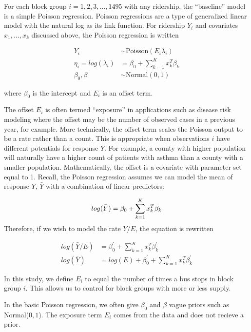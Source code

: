 \documentclass[
]{article}
\begin{document}
For each block group \(i = 1, 2, 3, ..., 1495\) with any ridership, the
``baseline'' model is a simple Poisson regression. Poisson regressions
are a type of generalized linear model with the natural log as its link
function. For ridership \(Y_i\) and covariates \(x_1, ..., x_k\)
discussed above, the Poisson regression is written

\[
\begin{aligned}
Y_i & \sim \text{Poisson}(E_i\lambda_i) \\
\eta_i  = log(\lambda_i) & = \beta_0 + \sum_{k=1}^{K}x_k^T\beta_k \\
\beta_0, \beta &\sim \text{Normal}(0, 1)
\end{aligned}
\]

where \(\beta_0\) is the intercept and \(E_i\) is an offset term.

The offset \(E_i\) is often termed ``exposure'' in applications such as
disease risk modeling where the offset may be the number of observed
cases in a previous year, for example. More technically, the offset term
scales the Poisson output to be a rate rather than a count. This is
appropriate when observations \(i\) have different potentials for
response \(Y\). For example, a county with higher population will
naturally have a higher count of patients with asthma than a county with
a smaller population. Mathematically, the offset is a covariate with
parameter set equal to 1. Recall, the Poisson regression assumes we can
model the mean of response \(Y\), \(\bar{Y}\) with a combination of
linear predictors:

\[
log(\bar{Y}) = \beta_0 + \sum_{k=1}^{K}x_k^T\beta_k \\
\] Therefore, if we wish to model the rate \(Y/E\), the equation is
rewritten

\[
\begin{aligned}
log(\bar{Y}/E) & = \beta^{'}_0 + \sum_{k=1}^{K}x_k^T\beta^{'}_k \\
log(\bar{Y}) & = log(E) + \beta^{'}_0 + \sum_{k=1}^{K}x_k^T\beta^{'}_k
\end{aligned}
\]

In this study, we define \(E_i\) to equal the number of times a bus
stops in block group \(i\). This allows us to control for block groups
with more or less supply.

In the basic Poisson regression, we often give \(\beta_0\) and \(\beta\)
vague priors such as Normal(\(0, 1\)). The exposure term \(E_i\) comes
from the data and does not recieve a prior.
\end{document}
